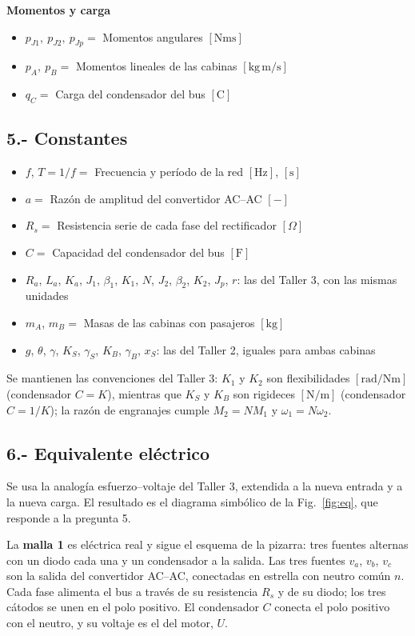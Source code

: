\documentclass[10pt,a4paper,twocolumn]{article}
\begin{document}
\noindent\textbf{Momentos y carga}
\begin{itemize}
  \item $p_{J1},\ p_{J2},\ p_{Jp} =$ Momentos angulares $[\mathrm{Nms}]$
  \item $p_A,\ p_B =$ Momentos lineales de las cabinas $[\mathrm{kg\,m/s}]$
  \item $q_C =$ Carga del condensador del bus $[\mathrm{C}]$
\end{itemize}

\subsection*{5.- Constantes}
\begin{itemize}
  \item $f$, $T = 1/f =$ Frecuencia y período de la red $[\mathrm{Hz}]$, $[\mathrm{s}]$
  \item $a =$ Razón de amplitud del convertidor AC--AC $[-]$
  \item $R_s =$ Resistencia serie de cada fase del rectificador $[\Omega]$
  \item $C =$ Capacidad del condensador del bus $[\mathrm{F}]$
  \item $R_a$, $L_a$, $K_a$, $J_1$, $\beta_1$, $K_1$, $N$, $J_2$, $\beta_2$, $K_2$, $J_p$,
        $r$: las del Taller 3, con las mismas unidades
  \item $m_A$, $m_B =$ Masas de las cabinas con pasajeros $[\mathrm{kg}]$
  \item $g$, $\theta$, $\gamma$, $K_S$, $\gamma_S$, $K_B$, $\gamma_B$, $x_S$: las del
        Taller 2, iguales para ambas cabinas
\end{itemize}

\noindent Se mantienen las convenciones del Taller 3: $K_1$ y $K_2$ son flexibilidades
$[\mathrm{rad/Nm}]$ (condensador $C=K$), mientras que $K_S$ y $K_B$ son rigideces
$[\mathrm{N/m}]$ (condensador $C=1/K$); la razón de engranajes cumple $M_2=N M_1$ y
$\omega_1 = N\omega_2$.

\subsection*{6.- Equivalente eléctrico}

Se usa la analogía esfuerzo--voltaje del Taller 3, extendida a la nueva entrada y a la
nueva carga. El resultado es el diagrama simbólico de la Fig.~\ref{fig:eq}, que responde a
la pregunta 5.

La \textbf{malla 1} es eléctrica real y sigue el esquema de la pizarra: tres fuentes
alternas con un diodo cada una y un condensador a la salida. Las tres fuentes $v_a$, $v_b$,
$v_c$ son la salida del convertidor AC--AC, conectadas en estrella con neutro común $n$.
Cada fase alimenta el bus a través de su resistencia $R_s$ y de su diodo; los tres cátodos
se unen en el polo positivo. El condensador $C$ conecta el polo positivo con el neutro, y su
voltaje es el del motor, $U$.
\end{document}
